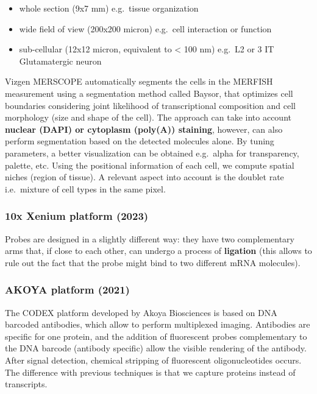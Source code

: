 \begin{itemize}
\tightlist
\item
  whole section (9x7 mm) e.g.~tissue organization
\item
  wide field of view (200x200 micron) e.g.~cell interaction or function
\item
  sub-cellular (12x12 micron, equivalent to \textless{} 100 nm) e.g.~L2
  or 3 IT Glutamatergic neuron
\end{itemize}

Vizgen MERSCOPE automatically segments the cells in the MERFISH
measurement using a segmentation method called Baysor, that optimizes
cell boundaries considering joint likelihood of transcriptional
composition and cell morphology (size and shape of the cell). The
approach can take into account \textbf{nuclear (DAPI) or cytoplasm
(poly(A)) staining}, however, can also perform segmentation based on the
detected molecules alone. By tuning parameters, a better visualization
can be obtained e.g.~alpha for transparency, palette, etc. Using the
positional information of each cell, we compute spatial niches (region
of tissue). A relevant aspect into account is the doublet rate
i.e.~mixture of cell types in the same pixel.

\hypertarget{x-xenium-platform-2023}{%
\subsubsection{\texorpdfstring{\textbf{10x Xenium platform
(2023)}}{10x Xenium platform (2023)}}\label{x-xenium-platform-2023}}

Probes are designed in a slightly different way: they have two
complementary arms that, if close to each other, can undergo a process
of \textbf{ligation} (this allows to rule out the fact that the probe
might bind to two different mRNA molecules).

\hypertarget{akoya-platform-2021}{%
\subsubsection{AKOYA platform (2021)}\label{akoya-platform-2021}}

The CODEX platform developed by Akoya Biosciences is based on DNA
barcoded antibodies, which allow to perform multiplexed imaging.
Antibodies are specific for one protein, and the addition of fluorescent
probes complementary to the DNA barcode (antibody specific) allow the
visible rendering of the antibody. After signal detection, chemical
stripping of fluorescent oligonucleotides occurs. The difference with
previous techniques is that we capture proteins instead of transcripts.

